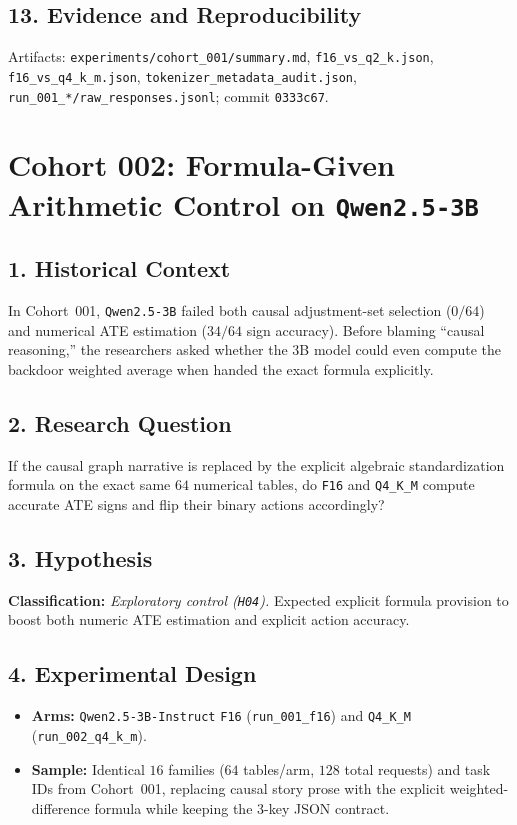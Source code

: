\subsection*{13. Evidence and Reproducibility}
Artifacts: \texttt{experiments/cohort\_001/summary.md}, \texttt{f16\_vs\_q2\_k.json}, \texttt{f16\_vs\_q4\_k\_m.json}, \texttt{tokenizer\_metadata\_audit.json}, \texttt{run\_001\_*/raw\_responses.jsonl}; commit \texttt{0333c67}.

\section{Cohort 002: Formula-Given Arithmetic Control on \texttt{Qwen2.5-3B}}

\subsection*{1. Historical Context}
In Cohort~001, \texttt{Qwen2.5-3B} failed both causal adjustment-set selection ($0/64$) and numerical ATE estimation ($34/64$ sign accuracy). Before blaming ``causal reasoning,'' the researchers asked whether the 3B model could even compute the backdoor weighted average when handed the exact formula explicitly.

\subsection*{2. Research Question}
If the causal graph narrative is replaced by the explicit algebraic standardization formula on the exact same $64$ numerical tables, do \texttt{F16} and \texttt{Q4\_K\_M} compute accurate ATE signs and flip their binary actions accordingly?

\subsection*{3. Hypothesis}
\textbf{Classification:} \emph{Exploratory control (\texttt{H04}).} Expected explicit formula provision to boost both numeric ATE estimation and explicit action accuracy.

\subsection*{4. Experimental Design}
\begin{itemize}
  \item \textbf{Arms:} \texttt{Qwen2.5-3B-Instruct} \texttt{F16} (\texttt{run\_001\_f16}) and \texttt{Q4\_K\_M} (\texttt{run\_002\_q4\_k\_m}).
  \item \textbf{Sample:} Identical $16$ families ($64$ tables/arm, $128$ total requests) and task IDs from Cohort~001, replacing causal story prose with the explicit weighted-difference formula while keeping the 3-key JSON contract.
\end{itemize}

